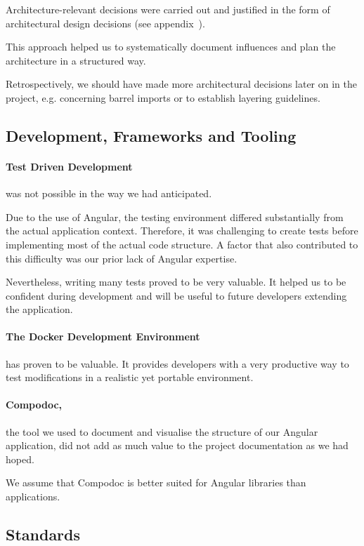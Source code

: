 Architecture-relevant decisions were carried out and justified in the form of architectural design decisions \cite{architectural-design-decisions} (see appendix~).

This approach helped us to systematically document influences and plan the architecture in a structured way.

Retrospectively, we should have made more architectural decisions later on in the project, e.g. concerning barrel imports or to establish layering guidelines.

\subsection{Development, Frameworks and Tooling}

\paragraph{Test Driven Development} was not possible in the way we had anticipated.

Due to the use of Angular, the testing environment differed substantially from the actual application context.
Therefore, it was challenging to create tests before implementing most of the actual code structure.
A factor that also contributed to this difficulty was our prior lack of Angular expertise.

Nevertheless, writing many tests proved to be very valuable.
It helped us to be confident during development and will be useful to future developers extending the application.

\paragraph{The Docker Development Environment} has proven to be valuable.
It provides developers with a very productive way to test modifications in a realistic yet portable environment.

\paragraph{Compodoc,} the tool we used to document and visualise the structure of our Angular application,
did not add as much value to the project documentation as we had hoped.

We assume that Compodoc is better suited for Angular libraries than applications.

\subsection{Standards}\label{lessons-learned-standards}

